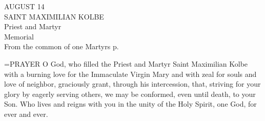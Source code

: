 \begin{center}\normalsize AUGUST 14\\
\footnotesize SAINT MAXIMILIAN KOLBE\\
\footnotesize Priest and Martyr\\
\footnotesize Memorial\\
\footnotesize From the common of one Martyrs p. \\
\end{center}

\hangindent=\parindent \small{PRAYER 
O God, who filled the Priest and Martyr Saint Maximilian Kolbe
with a burning love for the Immaculate Virgin Mary
and with zeal for souls and love of neighbor,
graciously grant, through his intercession,
that, striving for your glory by eagerly serving others,
we may be conformed, even until death, to your Son.
Who lives and reigns with you in the unity of the Holy Spirit,
one God, for ever and ever.\\}
 
